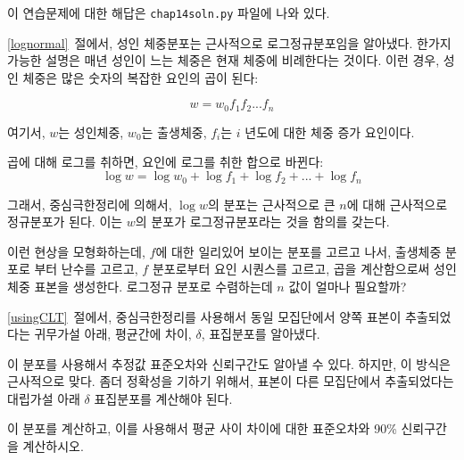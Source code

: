 이 연습문제에 대한 해답은 \verb"chap14soln.py" 파일에 나와 있다.

\begin{exercise}
\label{log_clt}

\ref{lognormal}~절에서, 성인 체중분포는 근사적으로 로그정규분포임을 알아냈다.
한가지 가능한 설명은 매년 성인이 느는 체중은 현재 체중에 비례한다는 것이다.
이런 경우, 성인 체중은 많은 숫자의 복잡한 요인의 곱이 된다:

%
\[ w = w_0 f_1 f_2 ... f_n  \]
%

여기서, $w$는 성인체중, $w_0$는 출생체중,
$f_i$는 $i$ 년도에 대한 체중 증가 요인이다.


곱에 대해 로그를 취하면, 요인에 로그를 취한 합으로 바뀐다:
%
\[ \log w = \log w_0 + \log f_1 + \log f_2 + ... + \log f_n \]
%

그래서, 중심극한정리에 의해서, 
$\log w$의 분포는 근사적으로 큰 $n$에 대해 근사적으로 정규분포가 된다.
이는 $w$의 분포가 로그정규분포라는 것을 함의를 갖는다.

이런 현상을 모형화하는데, $f$에 대한 일리있어 보이는 분포를 고르고 나서,
출생체중 분포로 부터 난수를 고르고, $f$ 분포로부터 요인 시퀀스를 고르고,
곱을 계산함으로써 성인체중 표본을 생성한다.
로그정규 분포로 수렴하는데 $n$ 값이 얼마나 필요할까?



\end{exercise}



\begin{exercise}

\ref{usingCLT}~절에서, 중심극한정리를 사용해서 
동일 모집단에서 양쪽 표본이 추출되었다는 귀무가설 아래,
평균간에 차이, $\delta$, 표집분포를 알아냈다.

이 분포를 사용해서 추정값 표준오차와 신뢰구간도 알아낼 수 있다.
하지만, 이 방식은 근사적으로 맞다.
좀더 정확성을 기하기 위해서, 표본이 다른 모집단에서 추출되었다는
대립가설 아래 $\delta$ 표집분포를 계산해야 된다.

이 분포를 계산하고, 이를 사용해서 평균 사이 차이에 대한 
표준오차와 90\% 신뢰구간을 계산하시오.
\end{exercise}


